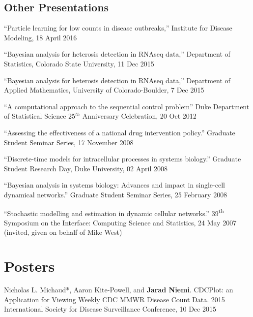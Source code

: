 \documentclass[overlapped,line]{res}
\newcommand{\sinceappt}{}
\begin{document}
\begin{resume}
{}

\subsection{\bf Other Presentations} \vspace{-0.2in}

%

{\small

``Particle learning for low counts in disease outbreaks,'' Institute for Disease Modeling, 18 April 2016

``Bayesian analysis for heterosis detection in RNAseq data,'' Department of Statistics, Colorado State University, 11 Dec 2015

``Bayesian analysis for heterosis detection in RNAseq data,'' Department of Applied Mathematics, University of Colorado-Boulder, 7 Dec 2015

``A computational approach to the sequential control problem'' Duke Department of Statistical Science 25$^{th}$ Anniversary Celebration, 20 Oct 2012 

\sinceappt

``Assessing the effectiveness of a national drug intervention policy.'' Graduate Student Seminar Series, 17 November 2008 

``Discrete-time models for intracellular processes in systems biology.'' Graduate Student Research Day, Duke University, 02 April 2008 

``Bayesian analysis in systems biology: Advances and impact in single-cell dynamical networks.'' Graduate Student Seminar Series, 25 February 2008 

``Stochastic modelling and estimation in dynamic cellular networks.'' 39\textsuperscript{th} Symposium on the Interface: Computing Science and Statistics, 24 May 2007 (invited, given on behalf of Mike West)
}


\section{\bf Posters}

{\small

Nicholas L. Michaud*, Aaron Kite-Powell, and {\bf Jarad Niemi}. CDCPlot: an Application for Viewing Weekly CDC MMWR Disease Count Data. 2015 International Society for Disease Surveillance Conference, 10 Dec 2015

}
\end{resume}
\end{document}
